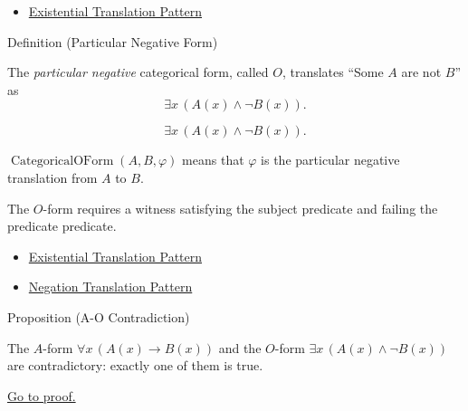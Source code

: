\begin{dependencies}
\begin{itemize}
  \item \hyperref[prop:existential-translation-pattern]{Existential Translation Pattern}
\end{itemize}
\end{dependencies}

\begin{definitionbox}{Definition (Particular Negative Form)}
\begin{definition}
\label{def:categorical-o-form-predicate-logic}
The \emph{particular negative} categorical form, called \(O\), translates
``Some \(A\) are not \(B\)'' as
\[
\exists x\,(A(x)\land \neg B(x)).
\]
\end{definition}
\end{definitionbox}

\begin{remark*}
\[
\exists x\,(A(x)\land \neg B(x)).
\]
\end{remark*}

\begin{remark*}
\(\operatorname{CategoricalOForm}(A,B,\varphi)\) means that \(\varphi\) is the
particular negative translation from \(A\) to \(B\).
\end{remark*}

\begin{remark*}[Interpretation]
The \(O\)-form requires a witness satisfying the subject predicate and failing
the predicate predicate.
\end{remark*}

\begin{dependencies}
\begin{itemize}
  \item \hyperref[prop:existential-translation-pattern]{Existential Translation Pattern}
  \item \hyperref[prop:negation-translation-pattern]{Negation Translation Pattern}
\end{itemize}
\end{dependencies}

\begin{propositionbox}{Proposition (A-O Contradiction)}
\begin{proposition}[A-O Contradiction]
\label{prop:a-o-contradictory-predicate-logic}
The \(A\)-form \(\forall x\,(A(x)\to B(x))\) and the \(O\)-form
\(\exists x\,(A(x)\land \neg B(x))\) are contradictory: exactly one of them is
true.

\noindent\hyperref[prf:a-o-contradictory-predicate-logic]{Go to proof.}
\end{proposition}
\end{propositionbox}

